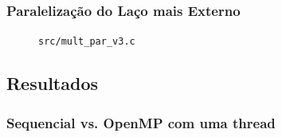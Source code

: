 \documentclass[a4paper, 12pt]{article}
\begin{document}
\subsubsection{Paralelização do Laço mais Externo}

\begin{figure}[H]
    \centering
    
    \caption{\texttt{src/mult\_par\_v3.c}}
    \label{fig:par_v3}
\end{figure}

\subsection{Resultados} \label{sec:res}

\newpage
\subsubsection{Sequencial vs. OpenMP com uma thread}
\end{document}
